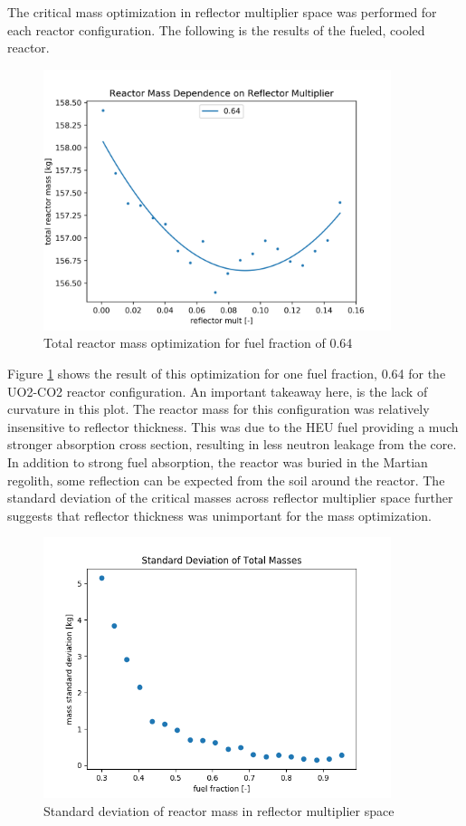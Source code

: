 The critical mass optimization in reflector multiplier space was performed for
each reactor configuration. The following is the results of the \uox fueled,
\codiox cooled reactor.

\begin{figure}[h]
    \centering
    \includegraphics[width=4in]{../images/mass_mult_064.png}
\caption{Total reactor mass optimization for fuel fraction of 0.64}
\label{fig:mass_mult_one}
\end{figure}

Figure \ref{fig:mass_mult_one} shows the result of this optimization for one
fuel fraction, 0.64 for the UO2-CO2 reactor configuration. An important takeaway here, is the lack of curvature in
this plot. The reactor mass for this configuration was relatively insensitive to
reflector thickness. This was due to the HEU fuel providing a much
stronger absorption cross section, resulting in less neutron leakage from the core. In
addition to strong fuel absorption, the reactor was buried in the Martian
regolith, some reflection can be expected from the soil around the reactor.
The standard deviation of the critical masses across reflector multiplier space
further suggests that reflector thickness was unimportant for the mass
optimization.

\begin{figure}[h]
    \centering
    \includegraphics[width=4in]{../images/mass_std_uo2_co2.png}
\caption{Standard deviation of reactor mass in reflector multiplier space}
\label{fig:mass_std_co2_uo2}
\end{figure}

